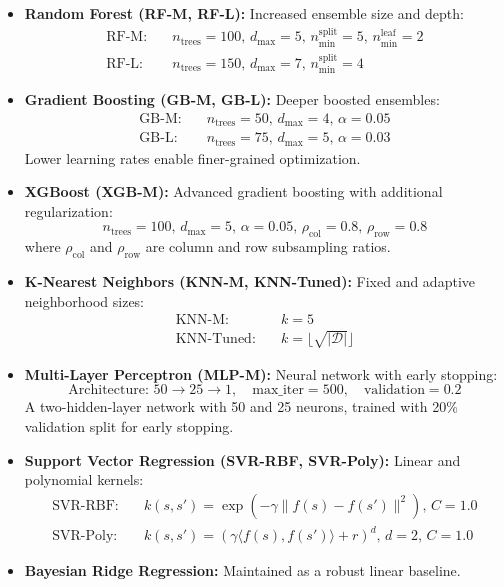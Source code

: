 \documentclass[conference]{IEEEtran}
\begin{document}
\begin{itemize}
    \item \textbf{Random Forest (RF-M, RF-L):} Increased ensemble size and depth:
    \begin{align}
    \text{RF-M:} \quad & n_{\text{trees}} = 100, \, d_{\max} = 5, \, n_{\min}^{\text{split}} = 5, \, n_{\min}^{\text{leaf}} = 2 \\
    \text{RF-L:} \quad & n_{\text{trees}} = 150, \, d_{\max} = 7, \, n_{\min}^{\text{split}} = 4
    \end{align}
    
    \item \textbf{Gradient Boosting (GB-M, GB-L):} Deeper boosted ensembles:
    \begin{align}
    \text{GB-M:} \quad & n_{\text{trees}} = 50, \, d_{\max} = 4, \, \alpha = 0.05 \\
    \text{GB-L:} \quad & n_{\text{trees}} = 75, \, d_{\max} = 5, \, \alpha = 0.03
    \end{align}
    Lower learning rates enable finer-grained optimization.
    
    \item \textbf{XGBoost (XGB-M):} Advanced gradient boosting with additional regularization:
    \begin{equation}
    n_{\text{trees}} = 100, \, d_{\max} = 5, \, \alpha = 0.05, \, \rho_{\text{col}} = 0.8, \, \rho_{\text{row}} = 0.8
    \end{equation}
    where $\rho_{\text{col}}$ and $\rho_{\text{row}}$ are column and row subsampling ratios.
    
    \item \textbf{K-Nearest Neighbors (KNN-M, KNN-Tuned):} Fixed and adaptive neighborhood sizes:
    \begin{align}
    \text{KNN-M:} \quad & k = 5 \\
    \text{KNN-Tuned:} \quad & k = \lfloor \sqrt{|\mathcal{D}|} \rfloor
    \end{align}
    
    \item \textbf{Multi-Layer Perceptron (MLP-M):} Neural network with early stopping:
    \begin{equation}
    \text{Architecture: } 50 \to 25 \to 1, \quad \text{max\_iter} = 500, \quad \text{validation} = 0.2
    \end{equation}
    A two-hidden-layer network with 50 and 25 neurons, trained with 20\% validation split for early stopping.
    
    \item \textbf{Support Vector Regression (SVR-RBF, SVR-Poly):} Linear and polynomial kernels:
    \begin{align}
    \text{SVR-RBF:} \quad & k(s, s') = \exp(-\gamma\|f(s) - f(s')\|^2), \, C = 1.0 \\
    \text{SVR-Poly:} \quad & k(s, s') = (\gamma \langle f(s), f(s') \rangle + r)^d, \, d = 2, \, C = 1.0
    \end{align}
    
    \item \textbf{Bayesian Ridge Regression:} Maintained as a robust linear baseline.
\end{itemize}
\end{document}
